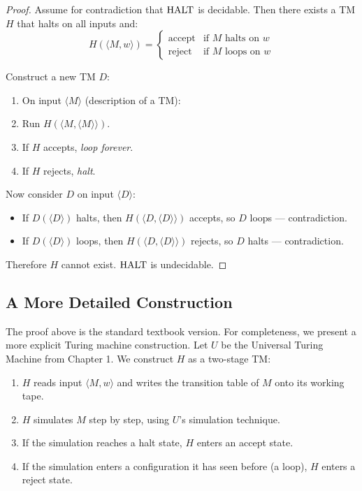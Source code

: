 \begin{proof}
Assume for contradiction that $\text{HALT}$ is decidable. Then there exists a TM $H$ that halts on all inputs and:
\[
H(\langle M, w \rangle) = 
\begin{cases}
\text{accept} & \text{if } M \text{ halts on } w \\
\text{reject} & \text{if } M \text{ loops on } w
\end{cases}
\]

Construct a new TM $D$:
\begin{enumerate}
\item On input $\langle M \rangle$ (description of a TM):
\item Run $H(\langle M, \langle M \rangle \rangle)$.
\item If $H$ accepts, \emph{loop forever}.
\item If $H$ rejects, \emph{halt}.
\end{enumerate}

Now consider $D$ on input $\langle D \rangle$:
\begin{itemize}
\item If $D(\langle D \rangle)$ halts, then $H(\langle D, \langle D \rangle \rangle)$ accepts, so $D$ loops — contradiction.
\item If $D(\langle D \rangle)$ loops, then $H(\langle D, \langle D \rangle \rangle)$ rejects, so $D$ halts — contradiction.
\end{itemize}

Therefore $H$ cannot exist. $\text{HALT}$ is undecidable.
\end{proof}

\subsection*{A More Detailed Construction}

The proof above is the standard textbook version. For completeness, we present a more explicit Turing machine construction. Let $U$ be the Universal Turing Machine from Chapter 1. We construct $H$ as a two-stage TM:

\begin{enumerate}
\item $H$ reads input $\langle M, w \rangle$ and writes the transition table of $M$ onto its working tape.
\item $H$ simulates $M$ step by step, using $U$'s simulation technique.
\item If the simulation reaches a halt state, $H$ enters an accept state.
\item If the simulation enters a configuration it has seen before (a loop), $H$ enters a reject state.
\end{enumerate}


